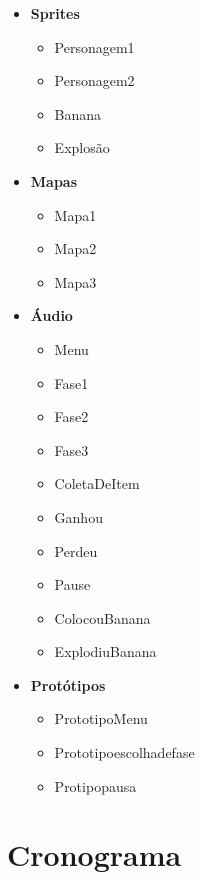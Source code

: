 \documentclass[12pt]{article}
\begin{document}
	\begin{itemize}
		\item \textbf{Sprites}
			\begin{itemize}

				\item Personagem1
				\item Personagem2
				\item Banana
				\item Explosão

			\end{itemize}
			
		\item \textbf{Mapas}
			\begin{itemize}

				\item Mapa1
				\item Mapa2
				\item Mapa3

			\end{itemize}

		\item \textbf{Áudio}
			\begin{itemize}

				\item Menu
				\item Fase1
				\item Fase2
				\item Fase3
				\item ColetaDeItem
				\item Ganhou
				\item Perdeu
				\item Pause
				\item ColocouBanana
				\item ExplodiuBanana

			\end{itemize}

		\item \textbf{Protótipos}
			\begin{itemize}

				\item PrototipoMenu
				\item Prototipoescolhadefase
				\item Protipopausa

			\end{itemize}
	\end{itemize}

\section{Cronograma}
\end{document}
